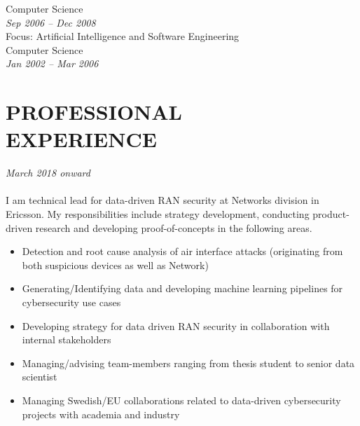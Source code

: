 \documentclass[margin, 10pt]{res} %
\begin{document}
\begin{resume}
{\bf \color{Black}{Master of Science,}} Computer Science \\ %
{\color{RubineRed}{Lahore University of Management Sciences, Pakistan}} \hfill \textit{Sep 2006 -- Dec 2008} \\
Focus: Artificial Intelligence and Software Engineering \\

{\bf \color{Black}{Bachelor of Science,}} Computer Science \\ %
{\color{RubineRed}{University of Peshawar, Pakistan}} \hfill \textit{Jan 2002 -- Mar 2006} \\


\section{PROFESSIONAL \\ EXPERIENCE}

{\sl \textbf{}} \hfill \textit{March 2018 onward} \\
{\color{RubineRed}{Ericsson AB, Sweden}} \\
I am technical lead for data-driven RAN security at Networks division in Ericsson. 
My responsibilities include strategy development, conducting product-driven research and developing proof-of-concepts 
in the following areas.

\begin{itemize}
    \item Detection and root cause analysis of air interface attacks (originating from both suspicious devices as well as Network)
    \item Generating/Identifying data and developing machine learning pipelines for cybersecurity use cases
    \item Developing strategy for data driven RAN security in collaboration with internal stakeholders
    \item Managing/advising team-members ranging from thesis student to senior data scientist
    \item Managing Swedish/EU collaborations related to data-driven cybersecurity projects with academia and industry
\end{itemize}


\end{resume}
\end{document}
